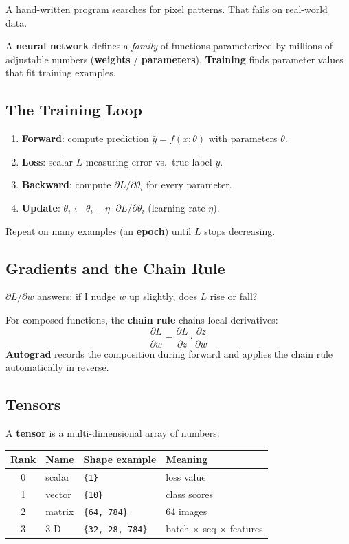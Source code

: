 \documentclass[11pt,a4paper]{article}
\begin{document}
A hand-written program searches for pixel patterns. That fails on real-world data.

A \textbf{neural network} defines a \emph{family} of functions parameterized by millions
of adjustable numbers (\textbf{weights} / \textbf{parameters}). \textbf{Training} finds
parameter values that fit training examples.

\subsection{The Training Loop}

\begin{enumerate}[leftmargin=*]
  \item \textbf{Forward}: compute prediction $\hat{y} = f(x; \theta)$ with parameters $\theta$.
  \item \textbf{Loss}: scalar $L$ measuring error vs.\ true label $y$.
  \item \textbf{Backward}: compute $\partial L / \partial \theta_i$ for every parameter.
  \item \textbf{Update}: $\theta_i \leftarrow \theta_i - \eta \cdot \partial L / \partial \theta_i$
        (learning rate $\eta$).
\end{enumerate}

Repeat on many examples (an \textbf{epoch}) until $L$ stops decreasing.

\subsection{Gradients and the Chain Rule}

$\partial L / \partial w$ answers: if I nudge $w$ up slightly, does $L$ rise or fall?

For composed functions, the \textbf{chain rule} chains local derivatives:
\begin{equation}
  \frac{\partial L}{\partial w}
    = \frac{\partial L}{\partial z} \cdot \frac{\partial z}{\partial w}
\end{equation}
\textbf{Autograd} records the composition during forward and applies the chain rule
automatically in reverse.

\subsection{Tensors}

A \textbf{tensor} is a multi-dimensional array of numbers:

\begin{center}
\begin{tabular}{@{}clll@{}}
  \toprule
  Rank & Name & Shape example & Meaning \\
  \midrule
  0 & scalar & \texttt{\{1\}} & loss value \\
  1 & vector & \texttt{\{10\}} & class scores \\
  2 & matrix & \texttt{\{64, 784\}} & 64 images \\
  3 & 3-D & \texttt{\{32, 28, 784\}} & batch $\times$ seq $\times$ features \\
  \bottomrule
\end{tabular}
\end{center}
\end{document}
